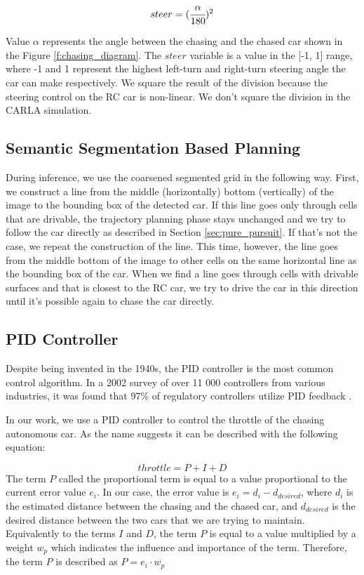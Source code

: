 \begin{equation}steer = (\cfrac{\alpha}{\textrm{180}})^{2}\end{equation}

Value $\alpha$ represents the angle between the chasing and the chased car shown in the Figure \ref{f:chasing_diagram}. The $steer$ variable is a value in the [-1, 1] range, where -1 and 1 represent the highest left-turn and right-turn steering angle the car can make respectively. We square the result of the division because the steering control on the RC car is non-linear. We don't square the division in the CARLA simulation.




\subsection{Semantic Segmentation Based Planning}
During inference, we use the coarsened segmented grid in the following way. First, we construct a line from the middle (horizontally) bottom (vertically) of the image to the bounding box of the detected car. If this line goes only through cells that are drivable, the trajectory planning phase stays unchanged and we try to follow the car directly as described in Section \ref{sec:pure_pursuit}. If that's not the case, we repeat the construction of the line. This time, however, the line goes from the middle bottom of the image to other cells on the same horizontal line as the bounding box of the car. When we find a line goes through cells with drivable surfaces and that is closest to the RC car, we try to drive the car in this direction until it's possible again to chase the car directly.

\subsection{PID Controller}
Despite being invented in the 1940s, the PID controller is the most common control algorithm. In a 2002 survey of over 11 000 controllers from various industries, it was found that 97\% of regulatory controllers utilize PID feedback \cite{PID-usage}. 

In our work, we use a PID controller to control the throttle of the chasing autonomous car. As the name suggests it can be described with the following equation:

\begin{equation}
throttle = P+I+D    
\end{equation}
The term $P$ called the proportional term is equal to a value proportional to the current error value $e_i$. In our case, the error value is $e_i = d_i - d_{desired}$, where $d_i$ is the estimated distance between the chasing and the chased car, and $d_{desired}$ is the desired distance between the two cars that we are trying to maintain. Equivalently to the terms $I$ and $D$, the term $P$ is equal to a value multiplied by a weight $w_p$ which indicates the influence and importance of the term. Therefore, the term $P$ is described as $P = e_i\cdot w_p$ \par


